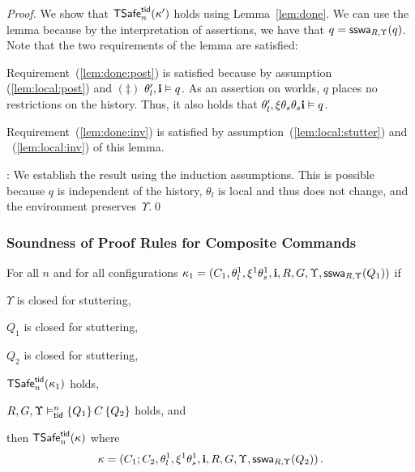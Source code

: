 \begin{proof}
We show that $\safe_{n}(\kappa')$ holds using Lemma~\ref{lem:done}.
We can use the lemma because by the interpretation of assertions, we have that $q=\sswa{q}{R}{\Upsilon}$.
Note that the two requirements of the lemma are satisfied:
\begin{compactitem}
\item
Requirement~(\ref{lem:done:post}) is satisfied because by assumption (\ref{lem:local:post}) and $(\ddag)$
$\theta'_l,\intp \vDash q$. As an assertion on worlds, $q$ 
places no restrictions on the history. 
Thus, it also holds that $\theta'_l,\xi\theta_s\theta_s\intp \vDash q$.   
\item
Requirement~(\ref{lem:done:inv}) is satisfied by assumption~(\ref{lem:local:stutter}) and ~(\ref{lem:local:inv})
of this lemma.
\end{compactitem}

: 
We establish the result using the induction assumptions.
This is possible because  $q$ is independent of the history, $\theta_l$ is local and thus does not   change,
and the environment preserves~$\Upsilon$.\qed
\end{proof}




\subsubsection{Soundness of Proof Rules for Composite Commands} %
\label{sec:sound:composite}




\begin{lemma}[Seq]\label{lem:seq}
For all $n$ and for all 
configurations $\kappa_1 = (C_1,\theta^1_l,\xi^1\theta^1_s,\intp,R,G,\Upsilon, \sswa{Q_1}{R}{\Upsilon})$
if  
\begin{compactenum}[(i)]
\item \label{lem:seq:stutter} 
$\Upsilon$ is closed for stuttering, 
\item \label{lem:seq:stutterq} 
$Q_1$ is closed for stuttering, 
\item \label{lem:seq:stutterqq} 
$Q_2$ is closed for stuttering, 
\item \label{lem:seq:c}
$\safe_n(\kappa_1)$ holds,
\item \label{lem:seq:cc}
$R,G,\Upsilon \vDash_{\ltid}^n \{Q_1\} \, C \, \{Q_2\}$ holds, and
\end{compactenum}
then  $\safe_n(\kappa)$ where 
$$\kappa=(C_1;C_2,\theta^1_l,\xi^1\theta^1_s,\intp,R,G,\Upsilon, \sswa{Q_2}{R}{\Upsilon})\,.$$
\end{lemma}



